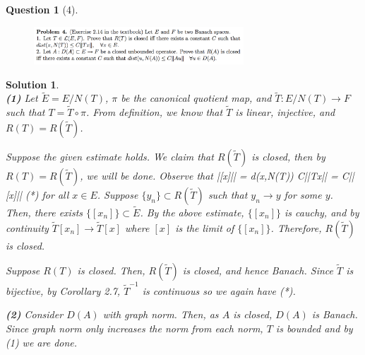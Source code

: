 \documentclass{article} %
\def\eQb#1\eQe{\begin{eqnarray*}#1\end{eqnarray*}}
\theoremstyle{quest}
\newtheorem*{question}{Question}
\newtheorem*{solution}{Solution}
\begin{document}
\newpage

\begin{question}[4]
\hfill
\begin{figure}[h!]
  \centering
    \includegraphics[width=0.7\textwidth]{funcA-h-e2-p4.png}
\end{figure}
\end{question}
\begin{solution} \hfill \\
\textbf{(1)}
Let $\tilde{E} = E / N(T)$, $\pi$ be the canonical quotient map,
and $\tilde{T}:E / N(T) \to F$ such that $T = \tilde{T} \circ \pi$.
From definition, we know that $\tilde{T}$ is linear, injective, and $R(T) 
= R(\tilde{T})$. 

\smallskip

Suppose the given estimate holds. We claim that $R(\tilde{T})$ is closed, then by 
$R(T) = R(\tilde{T})$, we will be done. Observe that 
\eQb
||[x]|| = d(x,N(T)) \leq C||Tx|| = C||[x]|| (*)
\eQe  
for all $x \in E$. Suppose $\{y_n\} \subset R(\tilde{T})$ such that $y_n \to y$ for some
$y$. Then, there exists 
$\{[x_n]\} \subset \tilde{E}$. By the above estimate, $\{[x_n]\}$ is
cauchy, and by continuity $\tilde{T}[x_n] \to \tilde{T}[x]$ where $[x]$ is the
limit of $\{[x_n]\}$. Therefore, $R(\tilde{T})$ is closed. 

Suppose $R(T)$ is closed. Then, $R(\tilde{T})$ is closed, and hence Banach.
Since $\tilde{T}$ is bijective, by Corollary 2.7, $\tilde{T}^{-1}$ is continuous so 
we again have (*).

\bigskip

\textbf{(2)} Consider $D(A)$ with graph norm. Then, as $A$ is closed, $D(A)$ is 
Banach. Since graph norm only increases the norm from each norm, $T$ is bounded
and by (1) we are done.



\end{solution}

\newpage
\end{document}
